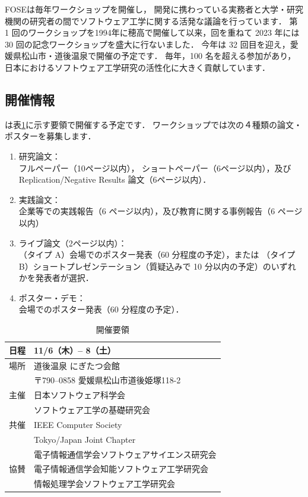 \documentclass[T,J]{fose} %
\begin{document}
FOSEは毎年ワークショップを開催し，
開発に携わっている実務者と大学・研究機関の研究者の間でソフトウェア工学に関する活発な議論を行っています．
第 1 回のワークショップを1994年に穂高で開催して以来，回を重ねて 2023 年には 30 回の記念ワークショップを盛大に行ないました．
今年は 32 回目を迎え，愛媛県松山市・道後温泉で開催の予定です．
毎年，100 名を超える参加があり，日本におけるソフトウェア工学研究の活性化に大きく貢献しています．

\subsection{開催情報}
\foseabbrev\cite{fose2025}は表\ref{tbl:workshop}に示す要領で開催する予定です．
ワークショップでは次の４種類の論文・ポスターを募集します．

\begin{enumerate}
	\item 研究論文：\\
	フルペーパー（10ページ以内），
	ショートペーパー（6ページ以内），及び
	Replication/Negative Results 論文（6ページ以内）．
	\item 実践論文：\\
	企業等での実践報告（6 ページ以内），及び教育に関する事例報告（6 ページ以内）
	\item ライブ論文（2ページ以内）：\\
	（タイプ A）会場でのポスター発表（60 分程度の予定），または
	（タイプ B）ショートプレゼンテーション（質疑込みで 10 分以内の予定）のいずれかを発表者が選択．
	\item ポスター・デモ：\\
	会場でのポスター発表（60 分程度の予定）．
\end{enumerate}


\begin{table}[b]
	\centering
	\caption{\foseabbrev 開催要領}
	\label{tbl:workshop}
	\small
	\doublerulesep=0.3pt
	\begin{tabular}{ll}\hline\hline\hline
		日程 & 11/6（木）-- 8（土）\\ \hline
		場所 & 道後温泉 にぎたつ会館 \\
		 & 〒790--0858 愛媛県松山市道後姫塚118-2 \\ \hline
		 主催 & 日本ソフトウェア科学会 \\
		 & ソフトウェア工学の基礎研究会 \\ \hline 
		 共催 & IEEE Computer Society \\
		 & Tokyo/Japan Joint Chapter \\ \hline
		 & 電子情報通信学会ソフトウェアサイエンス研究会 \\
		 協賛 & 電子情報通信学会知能ソフトウェア工学研究会 \\
		 & 情報処理学会ソフトウェア工学研究会 \\ \hline
	\end{tabular}
\end{table}
\end{document}
